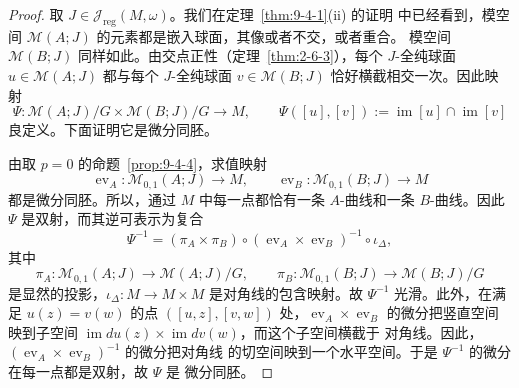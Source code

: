 \begin{proof}
取 $J\in\mathcal J_{\mathrm{reg}}(M,\omega)$。我们在定理~\ref{thm:9-4-1}(ii) 的证明
中已经看到，模空间 $\mathcal M(A;J)$ 的元素都是嵌入球面，其像或者不交，或者重合。
模空间 $\mathcal M(B;J)$ 同样如此。由交点正性（定理~\ref{thm:2-6-3}），每个
$J$-全纯球面 $u\in\mathcal M(A;J)$ 都与每个
$J$-全纯球面 $v\in\mathcal M(B;J)$ 恰好横截相交一次。因此映射
\[
  \Psi:\mathcal M(A;J)/G\times\mathcal M(B;J)/G\longrightarrow M,
  \qquad
  \Psi([u],[v]):=\operatorname{im}[u]\cap\operatorname{im}[v]
\]
良定义。下面证明它是微分同胚。

由取 $p=0$ 的命题~\ref{prop:9-4-4}，求值映射
\[
  \operatorname{ev}_A:\mathcal M_{0,1}(A;J)\to M,
  \qquad
  \operatorname{ev}_B:\mathcal M_{0,1}(B;J)\to M
\]
都是微分同胚。所以，通过 $M$ 中每一点都恰有一条 $A$-曲线和一条 $B$-曲线。因此
$\Psi$ 是双射，而其逆可表示为复合
\[
  \Psi^{-1}
  =(\pi_A\times\pi_B)\circ
    (\operatorname{ev}_A\times\operatorname{ev}_B)^{-1}\circ\iota_\Delta,
\]
其中
\[
  \pi_A:\mathcal M_{0,1}(A;J)\to\mathcal M(A;J)/G,
  \qquad
  \pi_B:\mathcal M_{0,1}(B;J)\to\mathcal M(B;J)/G
\]
是显然的投影，$\iota_\Delta:M\to M\times M$ 是对角线的包含映射。故
$\Psi^{-1}$ 光滑。此外，在满足 $u(z)=v(w)$ 的点
$([u,z],[v,w])$ 处，$\operatorname{ev}_A\times\operatorname{ev}_B$ 的微分把竖直空间
映到子空间 $\operatorname{im}du(z)\times\operatorname{im}dv(w)$，而这个子空间横截于
对角线。因此，$(\operatorname{ev}_A\times\operatorname{ev}_B)^{-1}$ 的微分把对角线
的切空间映到一个水平空间。于是 $\Psi^{-1}$ 的微分在每一点都是双射，故 $\Psi$ 是
微分同胚。


\end{proof}
